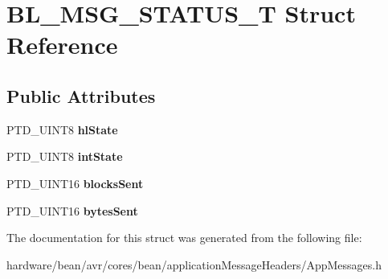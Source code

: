 \hypertarget{struct_b_l___m_s_g___s_t_a_t_u_s___t}{}\section{B\+L\+\_\+\+M\+S\+G\+\_\+\+S\+T\+A\+T\+U\+S\+\_\+\+T Struct Reference}
\label{struct_b_l___m_s_g___s_t_a_t_u_s___t}
\subsection*{Public Attributes}
\begin{DoxyCompactItemize}
\item 
\hypertarget{struct_b_l___m_s_g___s_t_a_t_u_s___t_a4effec1e63765a35393842da0b99ef6b}{}P\+T\+D\+\_\+\+U\+I\+N\+T8 {\bfseries hl\+State}\label{struct_b_l___m_s_g___s_t_a_t_u_s___t_a4effec1e63765a35393842da0b99ef6b}

\item 
\hypertarget{struct_b_l___m_s_g___s_t_a_t_u_s___t_a16c3b44d869de82f5f87ea0b1335f8b5}{}P\+T\+D\+\_\+\+U\+I\+N\+T8 {\bfseries int\+State}\label{struct_b_l___m_s_g___s_t_a_t_u_s___t_a16c3b44d869de82f5f87ea0b1335f8b5}

\item 
\hypertarget{struct_b_l___m_s_g___s_t_a_t_u_s___t_a7fd8df74353b15d8ea4d58cf5baca701}{}P\+T\+D\+\_\+\+U\+I\+N\+T16 {\bfseries blocks\+Sent}\label{struct_b_l___m_s_g___s_t_a_t_u_s___t_a7fd8df74353b15d8ea4d58cf5baca701}

\item 
\hypertarget{struct_b_l___m_s_g___s_t_a_t_u_s___t_ac1f0614b561e348afd6e16648690ff9e}{}P\+T\+D\+\_\+\+U\+I\+N\+T16 {\bfseries bytes\+Sent}\label{struct_b_l___m_s_g___s_t_a_t_u_s___t_ac1f0614b561e348afd6e16648690ff9e}

\end{DoxyCompactItemize}


The documentation for this struct was generated from the following file\+:\begin{DoxyCompactItemize}
\item 
hardware/bean/avr/cores/bean/application\+Message\+Headers/App\+Messages.\+h\end{DoxyCompactItemize}
